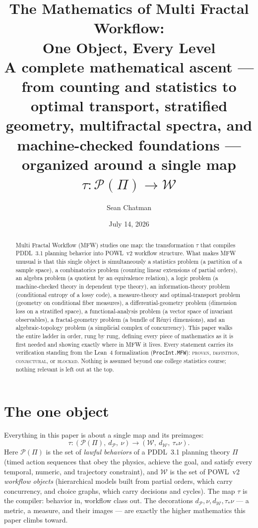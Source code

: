 \documentclass[11pt]{article}
\title{The Mathematics of Multi Fractal Workflow:\\
One Object, Every Level\\[0.5em]
\large A complete mathematical ascent --- from counting and statistics to
optimal transport, stratified geometry, multifractal spectra, and
machine-checked foundations --- organized around a single map
$\tau : \mathcal{P}(\Pi) \to \mathcal{W}$}
\author{Sean Chatman}
\date{July 14, 2026}
\newcommand{\PT}{\Pi}
\newcommand{\PS}{\mathcal{P}(\PT)}
\newcommand{\WS}{\mathcal{W}}
\newcommand{\dW}{d_{\mathcal{W}}}
\newcommand{\dP}{d_{\mathcal{P}}}
\theoremstyle{plain}
\theoremstyle{definition}
\theoremstyle{remark}
\begin{document}
\maketitle

\begin{abstract}
\noindent Multi Fractal Workflow (MFW) studies one map: the transformation
$\tau$ that compiles PDDL~3.1 planning behavior into POWL~v2 workflow
structure. What makes MFW unusual is that this single object is
simultaneously a statistics problem (a partition of a sample space), a
combinatorics problem (counting linear extensions of partial orders), an
algebra problem (a quotient by an equivalence relation), a logic problem (a
machine-checked theory in dependent type theory), an information-theory
problem (conditional entropy of a lossy code), a measure-theory and
optimal-transport problem (geometry on conditional fiber measures), a
differential-geometry problem (dimension loss on a stratified space), a
functional-analysis problem (a vector space of invariant observables), a
fractal-geometry problem (a bundle of R\'enyi dimensions), and an
algebraic-topology problem (a simplicial complex of concurrency). This
paper walks the entire ladder in order, rung by rung, defining every piece
of mathematics as it is first needed and showing exactly where in MFW it
lives. Every statement carries its verification standing from the Lean~4
formalization (\texttt{ProcInt.MFW}): \textsc{proven},
\textsc{definition}, \textsc{conjectural}, or \textsc{blocked}. Nothing is
assumed beyond one college statistics course; nothing relevant is left out
at the top.
\end{abstract}

\tableofcontents

\section{The one object}
\label{sec:object}

Everything in this paper is about a single map and its preimages:
\[
  \tau : (\PS,\ \dP,\ \nu) \longrightarrow (\WS,\ \dW,\ \tau_{*}\nu).
\]
Here $\PS$ is the set of \emph{lawful behaviors} of a PDDL~3.1 planning
theory $\PT$ (timed action sequences that obey the physics, achieve the
goal, and satisfy every temporal, numeric, and trajectory constraint), and
$\WS$ is the set of POWL~v2 \emph{workflow objects} (hierarchical models
built from partial orders, which carry concurrency, and choice graphs,
which carry decisions and cycles). The map $\tau$ is the compiler: behavior
in, workflow class out. The decorations $\dP, \nu, \dW, \tau_{*}\nu$ ---
a metric, a measure, and their images --- are exactly the higher mathematics
this paper climbs toward.
\end{document}
